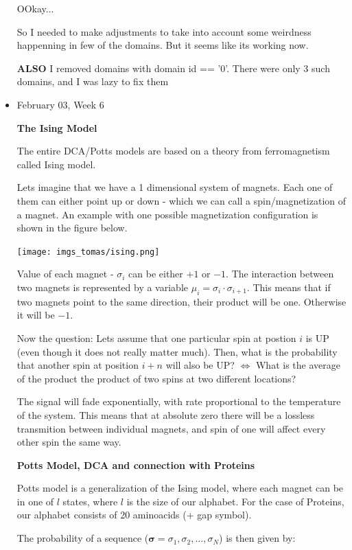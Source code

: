 \documentclass[11pt]{article}
\begin{document}
\begin{itemize}
    OOkay...
    
    So I needed to make adjustments to take into account some weirdness happenning in few of the domains. But it seems like its working now.
    
    \textbf{ALSO} I removed domains with domain id == '0'. There were only 3 such domains, and I was lazy to fix them

    \item February 03, Week 6
    
    \textbf{The Ising Model}
    
    The entire DCA/Potts models are based on a theory from ferromagnetism called Ising model. 
    
    Lets imagine that we have a 1 dimensional system of magnets. Each one of them can either point up or down - which we can call a spin/magnetization of a magnet. An example with one possible magnetization configuration is shown in the figure below.
    
    \begin{center}
        \texttt{[image: imgs\_tomas/ising.png]}
    \end{center}
    
    Value of each magnet - $\sigma_i$ can be either $+1$ or $-1$. The interaction between two magnets is represented by a variable $\mu_i = \sigma_i \cdot \sigma_{i+1}$. This means that if two magnets point to the same direction, their product will be one. Otherwise it will be $-1$.
    
    Now the question: Lets assume that one particular spin at postion $i$ is UP (even though it does not really matter much). Then, what is the probability that another spin at position $i+n$ will also be UP? $\iff$ What is the average of the product the product of two spins at two different locations?
    
    The signal will fade exponentially, with rate proportional to the temperature of the system. This means that at absolute zero there will be a lossless transmition between individual magnets, and spin of one will affect every other spin the same way. 
    
    \textbf{Potts Model, DCA and connection with Proteins}
    
    Potts model is a generalization of the Ising model, where each magnet can be in one of $l$ states, where $l$ is the size of our alphabet. For the case of Proteins, our alphabet consists of 20 aminoacids (+ gap symbol).
    
    The probability of a sequence ($\bm{\sigma} = \sigma_1, \sigma_2, ..., \sigma_N$) is then given by:
    

\end{itemize}
\end{document}

